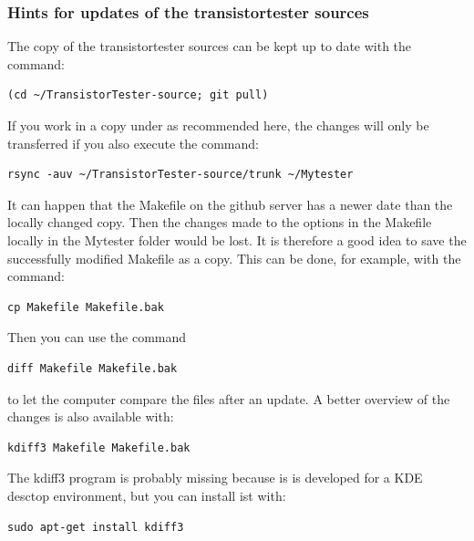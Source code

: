 \subsubsection{Hints for updates of the transistortester sources}
The copy of the transistortester sources can be kept up to date with the command:
\begin{large} \vspace{-0.4em} \begin{verbatim}
(cd ~/TransistorTester-source; git pull)
\end{verbatim} \end{large}
If you work in a copy under  as recommended here,
the changes will only be transferred if you also execute the command:
\begin{large} \vspace{-0.4em} \begin{verbatim}
rsync -auv ~/TransistorTester-source/trunk ~/Mytester
\end{verbatim} \end{large}
It can happen that the Makefile on the github server has a newer date than
the locally changed copy.
Then the changes made to the options in the Makefile locally in the Mytester folder would be lost.
It is therefore a good idea to save the successfully modified Makefile as a copy.
This can be done, for example, with the command:
\begin{large} \vspace{-0.4em} \begin{verbatim}
cp Makefile Makefile.bak
\end{verbatim} \end{large}
Then you can use the command
\begin{large} \vspace{-0.4em} \begin{verbatim}
diff Makefile Makefile.bak
\end{verbatim} \end{large}
to let the computer compare the files after an update.
A better overview of the changes is also available with:
\begin{large} \vspace{-0.4em} \begin{verbatim}
kdiff3 Makefile Makefile.bak
\end{verbatim} \end{large}
The kdiff3 program is probably missing because is is developed for a
KDE desctop environment, but you can install ist with:
\begin{large} \vspace{-0.4em} \begin{verbatim}
sudo apt-get install kdiff3
\end{verbatim} \end{large}

